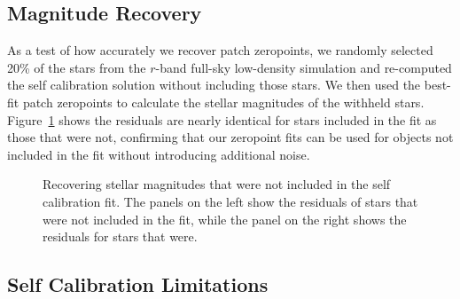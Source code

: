 \documentclass[12pt,preprint]{aastex}
\begin{document}

\subsection{Magnitude Recovery}

As a test of how accurately we recover patch zeropoints, we randomly selected 20\% of the stars from the $r$-band full-sky low-density simulation and re-computed the self calibration solution without including those stars.  We then used the best-fit patch zeropoints to calculate the stellar magnitudes of the withheld stars.  Figure~\ref{fig:zpcheck} shows the residuals are nearly identical for stars included in the fit as those that were not, confirming that our zeropoint fits can be used for objects not included in the fit without introducing additional noise.


\begin{figure}
\caption{Recovering stellar magnitudes that were not included in the self calibration fit.  The panels on the left show the residuals of stars that were not included in the fit, while the panel on the right shows the residuals for stars that were.  \label{fig:zpcheck}}
\end{figure}



\subsection{Self Calibration Limitations}
\end{document}
